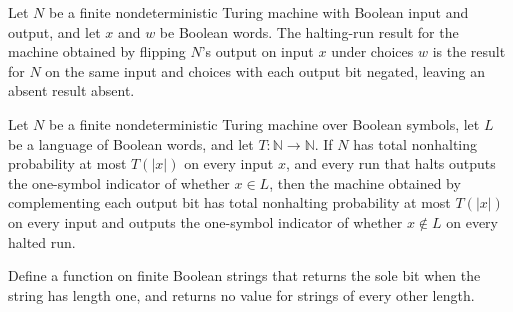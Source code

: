 \begin{theorem}
\label{Turing.FinNDTM.haltRun_flipOutput}
\leanok
{}
Let $N$ be a finite nondeterministic Turing machine with Boolean input and output, and
let $x$ and $w$ be Boolean words. The halting-run result for the machine obtained by
flipping $N$’s output on input $x$ under choices $w$ is the result for $N$ on the same
input and choices with each output bit negated, leaving an absent result absent.
\end{theorem}

\begin{theorem}
\label{Turing.FinNDTM.ZDecidesInTime.flipOutput}
\leanok
{}
Let $N$ be a finite nondeterministic Turing machine over Boolean symbols, let $L$ be a
language of Boolean words, and let $T\colon\mathbb{N}\to\mathbb{N}$. If $N$ has total
nonhalting probability at most $T(|x|)$ on every input $x$, and every run that halts
outputs the one-symbol indicator of whether $x\in L$, then the machine obtained by
complementing each output bit has total nonhalting probability at most $T(|x|)$ on every
input and outputs the one-symbol indicator of whether $x\notin L$ on every halted run.
\end{theorem}

\begin{definition}
\label{Turing.FinNDTM.bitOfOutput}
\leanok
Define a function on finite Boolean strings that returns the sole bit when the string
has length one, and returns no value for strings of every other length.
\end{definition}

